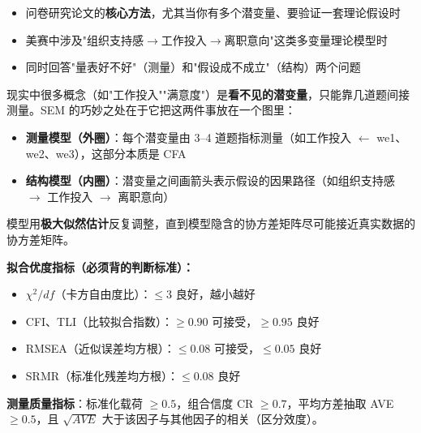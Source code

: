 \begin{algoscene}
\begin{itemize}
    \item 问卷研究论文的\textbf{核心方法}，尤其当你有多个潜变量、要验证一套理论假设时
    \item 美赛中涉及"组织支持感$\to$工作投入$\to$离职意向"这类多变量理论模型时
    \item 同时回答"量表好不好"（测量）和"假设成不成立"（结构）两个问题
\end{itemize}
\end{algoscene}

\begin{algoprinciple}
现实中很多概念（如"工作投入""满意度"）是\textbf{看不见的潜变量}，只能靠几道题间接测量。SEM 的巧妙之处在于它把这两件事放在一个图里：

\begin{itemize}
    \item \textbf{测量模型（外圈）}：每个潜变量由 3--4 道题指标测量（如工作投入 $\leftarrow$ we1、we2、we3），这部分本质是 CFA
    \item \textbf{结构模型（内圈）}：潜变量之间画箭头表示假设的因果路径（如组织支持感 $\to$ 工作投入 $\to$ 离职意向）
\end{itemize}

模型用\textbf{极大似然估计}反复调整，直到模型隐含的协方差矩阵尽可能接近真实数据的协方差矩阵。

\textbf{拟合优度指标（必须背的判断标准）：}
\begin{itemize}
    \item $\chi^2/df$（卡方自由度比）：$\leq 3$ 良好，越小越好
    \item CFI、TLI（比较拟合指数）：$\geq 0.90$ 可接受，$\geq 0.95$ 良好
    \item RMSEA（近似误差均方根）：$\leq 0.08$ 可接受，$\leq 0.05$ 良好
    \item SRMR（标准化残差均方根）：$\leq 0.08$ 良好
\end{itemize}

\textbf{测量质量指标}：标准化载荷 $\geq 0.5$，组合信度 CR $\geq 0.7$，平均方差抽取 AVE $\geq 0.5$，且 $\sqrt{AVE}$ 大于该因子与其他因子的相关（区分效度）。
\end{algoprinciple}

